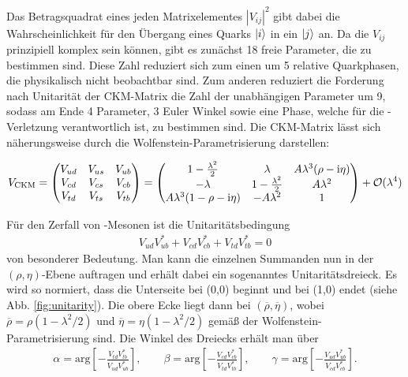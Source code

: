 Das Betragsquadrat eines jeden Matrixelementes $|V_{ij}|^2$ gibt dabei die Wahrscheinlichkeit für den Übergang eines Quarks $\Ket{i}$ in ein $\Ket{j}$ an. Da die $V_{ij}$ prinzipiell komplex sein können, gibt es zunächst 18 freie Parameter, die zu bestimmen sind. Diese Zahl reduziert sich zum einen um 5 relative Quarkphasen, die physikalisch nicht beobachtbar sind. Zum anderen reduziert die Forderung nach Unitarität der CKM-Matrix die Zahl der unabhängigen Parameter um 9, sodass am Ende 4 Parameter, 3 Euler Winkel sowie eine Phase, welche für die \CP-Verletzung verantwortlich ist, zu bestimmen sind. Die CKM-Matrix lässt sich näherungsweise durch die Wolfenstein-Parametrisierung darstellen:

\begin{align}
V_{\text{CKM}}=
\begin{pmatrix}
V_{ud} & V_{us} & V_{ub} \\
V_{cd} & V_{cs} & V_{cb} \\
V_{td} & V_{ts} & V_{tb} \\
\end{pmatrix}
=
\begin{pmatrix}
1-\frac{\lambda^2}{2} & \lambda & A\lambda^3(\rho-\mathrm{i}\eta) \\
-\lambda & 1-\frac{\lambda^2}{2} & A\lambda^2 \\
A\lambda^3(1-\rho-\mathrm{i}\eta) & -A\lambda^2 & 1
\end{pmatrix}
+ \mathcal{O}(\lambda^4)
\end{align}

Für den Zerfall von \Bd-Mesonen ist die Unitaritätsbedingung
\begin{align}
V_{ud}V_{ub}^* + V_{cd}V_{cb}^* + V_{td}V_{tb}^* = 0
\end{align}
von besonderer Bedeutung. Man kann die einzelnen Summanden nun in der $(\rho,\eta)$-Ebene auftragen und erhält dabei ein sogenanntes Unitaritätsdreieck. Es wird so normiert, dass die Unterseite bei (0,0) beginnt und bei (1,0) endet (siehe Abb. \ref{fig:unitarity}). Die obere Ecke liegt dann bei $(\overline{\rho}, \overline{\eta})$, wobei $\overline{\rho} = \rho(1-\lambda^2/2)$ und $\overline{\eta} = \eta(1-\lambda^2/2)$ gemäß der Wolfenstein-Parametrisierung sind. Die Winkel des Dreiecks erhält man über
\begin{align}
\alpha = \text{arg}\left[-\frac{V_{td}V_{tb}^*}{V_{ud}V_{ub}^*}\right], \qquad
\beta = \text{arg}\left[-\frac{V_{cd}V_{cb}^*}{V_{td}V_{tb}^*}\right], \qquad
\gamma = \text{arg}\left[-\frac{V_{ud}V_{ub}^*}{V_{cd}V_{cb}^*}\right].
\end{align}


